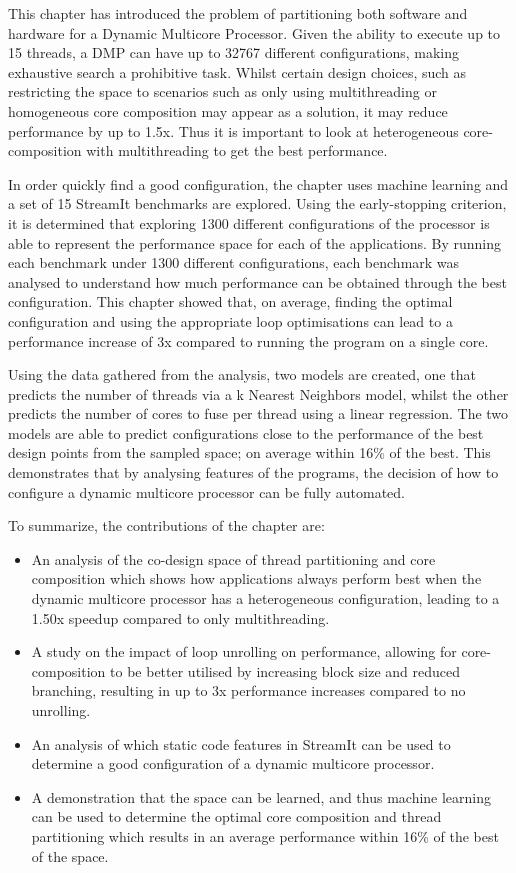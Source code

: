 This chapter has introduced the problem of partitioning both software and hardware for a Dynamic Multicore Processor.
Given the ability to execute up to 15 threads, a DMP can have up to 32767 different configurations, making exhaustive search a prohibitive task.
Whilst certain design choices, such as restricting the space to scenarios such as only using multithreading or homogeneous core composition may appear as a solution, it may reduce performance by up to 1.5x.
Thus it is important to look at heterogeneous core-composition with multithreading to get the best performance.

In order quickly find a good configuration, the chapter uses machine learning and a set of 15 StreamIt benchmarks are explored.
Using the early-stopping criterion, it is determined that exploring 1300 different configurations of the processor is able to represent the performance space for each of the applications.
By running each benchmark under 1300 different configurations, each benchmark was analysed to understand how much performance can be obtained through the best configuration.
This chapter showed that, on average, finding the optimal configuration and using the appropriate loop optimisations can lead to a performance increase of 3x compared to running the program on a single core.

Using the data gathered from the analysis, two models are created, one that predicts the number of threads via a k Nearest Neighbors model, whilst the other predicts the number of cores to fuse per thread using a linear regression.
The two models are able to predict configurations close to the performance of the best design points from the sampled space; on average within 16\% of the best.
This demonstrates that by analysing features of the programs, the decision of how to configure a dynamic multicore processor can be fully automated.

To summarize, the contributions of the chapter are:
\begin{itemize}
\item An analysis of the co-design space of thread partitioning and core composition which shows how applications always perform best when the dynamic multicore processor has a heterogeneous configuration, leading to a 1.50x speedup compared to only multithreading.
\vspace{-0.5em}
\item A study on the impact of loop unrolling on performance, allowing for core-composition to be better utilised by increasing block size and reduced branching, resulting in up to 3x performance increases compared to no unrolling.
\vspace{-0.5em}
\item An analysis of which static code features in StreamIt can be used to determine a good configuration of a dynamic multicore processor.
\vspace{-0.5em}
\item A demonstration that the space can be learned, and thus machine learning can be used to determine the optimal core composition and thread partitioning which results in an average performance within 16\% of the best of the space.
\end{itemize}
